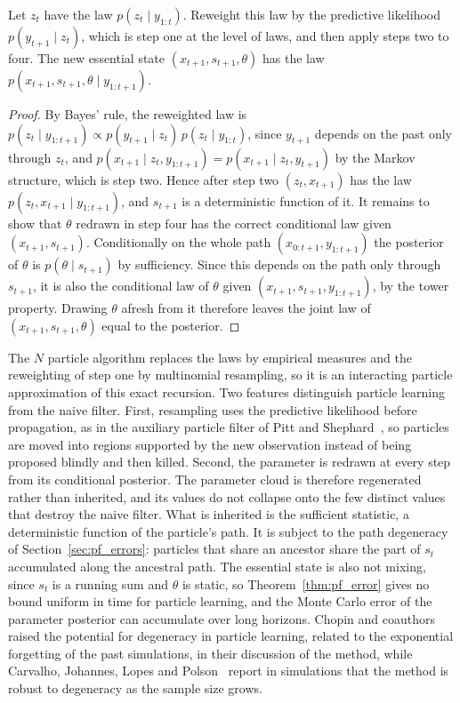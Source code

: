 \begin{proposition}
\label{prop:pl_exact}
Let $z_t$ have the law $p(z_t\mid y_{1:t})$. Reweight this law by the predictive likelihood $p(y_{t+1}\mid z_t)$, which is step one at the level of laws, and then apply steps two to four. The new essential state $(x_{t+1},s_{t+1},\theta)$ has the law $p(x_{t+1},s_{t+1},\theta\mid y_{1:t+1})$.
\end{proposition}

\begin{proof}
By Bayes' rule, the reweighted law is $p(z_t\mid y_{1:t+1})\propto p(y_{t+1}\mid z_t)\,p(z_t\mid y_{1:t})$, since $y_{t+1}$ depends on the past only through $z_t$, and $p(x_{t+1}\mid z_t,y_{1:t+1}) = p(x_{t+1}\mid z_t,y_{t+1})$ by the Markov structure, which is step two. Hence after step two $(z_t,x_{t+1})$ has the law $p(z_t,x_{t+1}\mid y_{1:t+1})$, and $s_{t+1}$ is a deterministic function of it. It remains to show that $\theta$ redrawn in step four has the correct conditional law given $(x_{t+1},s_{t+1})$. Conditionally on the whole path $(x_{0:t+1},y_{1:t+1})$ the posterior of $\theta$ is $p(\theta\mid s_{t+1})$ by sufficiency. Since this depends on the path only through $s_{t+1}$, it is also the conditional law of $\theta$ given $(x_{t+1},s_{t+1},y_{1:t+1})$, by the tower property. Drawing $\theta$ afresh from it therefore leaves the joint law of $(x_{t+1},s_{t+1},\theta)$ equal to the posterior.
\end{proof}

The $N$ particle algorithm replaces the laws by empirical measures and the reweighting of step one by multinomial resampling, so it is an interacting particle approximation of this exact recursion. Two features distinguish particle learning from the naive filter. First, resampling uses the predictive likelihood before propagation, as in the auxiliary particle filter of Pitt and Shephard~\cite{pittshephard1999}, so particles are moved into regions supported by the new observation instead of being proposed blindly and then killed. Second, the parameter is redrawn at every step from its conditional posterior. The parameter cloud is therefore regenerated rather than inherited, and its values do not collapse onto the few distinct values that destroy the naive filter. What is inherited is the sufficient statistic, a deterministic function of the particle's path. It is subject to the path degeneracy of Section~\ref{sec:pf_errors}: particles that share an ancestor share the part of $s_t$ accumulated along the ancestral path. The essential state is also not mixing, since $s_t$ is a running sum and $\theta$ is static, so Theorem~\ref{thm:pf_error} gives no bound uniform in time for particle learning, and the Monte Carlo error of the parameter posterior can accumulate over long horizons. Chopin and coauthors~\cite{chopin2010} raised the potential for degeneracy in particle learning, related to the exponential forgetting of the past simulations, in their discussion of the method, while Carvalho, Johannes, Lopes and Polson~\cite{cjlp2010} report in simulations that the method is robust to degeneracy as the sample size grows.

